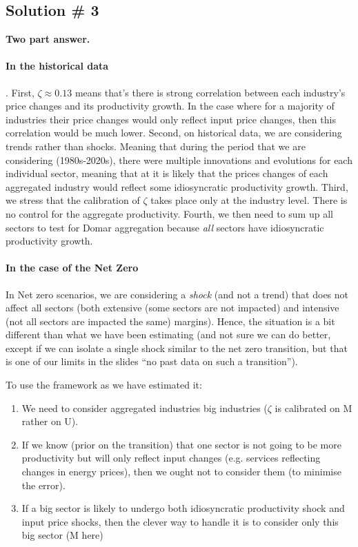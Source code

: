 \documentclass[11pt]{article}
\begin{document}
\subsection{Solution \# 3} \textbf{Two part answer. }


\paragraph{In the historical data}. First, $\zeta\approx0.13$ means that's there is strong correlation between each industry's price changes and its productivity growth. In the case where for a majority of industries their price changes would only reflect input price changes, then this correlation would be much lower. Second, on historical data, we are considering trends rather than shocks. Meaning that during the period that we are considering (1980s-2020s), there were multiple innovations and evolutions for each individual sector, meaning that at it is likely that the prices changes of each aggregated industry would reflect some idiosyncratic productivity growth. Third, we stress that the calibration of $\zeta$ takes place only at the industry level. There is no control for the aggregate productivity. Fourth, we then need to sum up all sectors to test for Domar aggregation because \textit{all} sectors have idiosyncratic productivity growth.

\paragraph{In the case of the Net Zero} In Net zero scenarios, we are considering a \textit{shock} (and not a trend) that does not affect all sectors (both extensive (some sectors are not impacted) and intensive (not all sectors are impacted the same) margins). Hence, the situation is a bit different than what we have been estimating (and not sure we can do better, except if we can isolate a single shock similar to the net zero transition, but that is one of our limits in the slides ``no past data on such a transition''). 

To use the framework as we have estimated it: 
\begin{enumerate}
    \item We need to consider aggregated industries big industries ($\zeta$ is calibrated on M rather on U).
    \item If we know (prior on the transition) that one sector is not going to be more productivity but will only reflect input changes (e.g. services reflecting changes in energy prices), then we ought not to consider them (to minimise the error). 
    \item If a big sector is likely to undergo both idiosyncratic productivity shock and input price shocks, then the clever way to handle it is to consider only this big sector (M here)
\end{enumerate}
\end{document}
